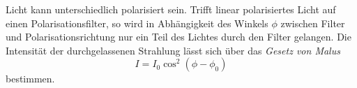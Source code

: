 Licht kann unterschiedlich polarisiert sein. Trifft linear polarisiertes Licht auf einen Polarisationsfilter, so wird in Abhängigkeit des Winkels $\phi$ zwischen Filter und Polarisationsrichtung nur ein Teil des Lichtes durch den Filter gelangen. Die Intensität der durchgelassenen Strahlung lässt sich über das \textit{Gesetz von Malus}
\begin{equation}
    \label{eqn:pol}
    I = I_0\cos^2{(\phi-\phi_0)}
\end{equation}
bestimmen.


